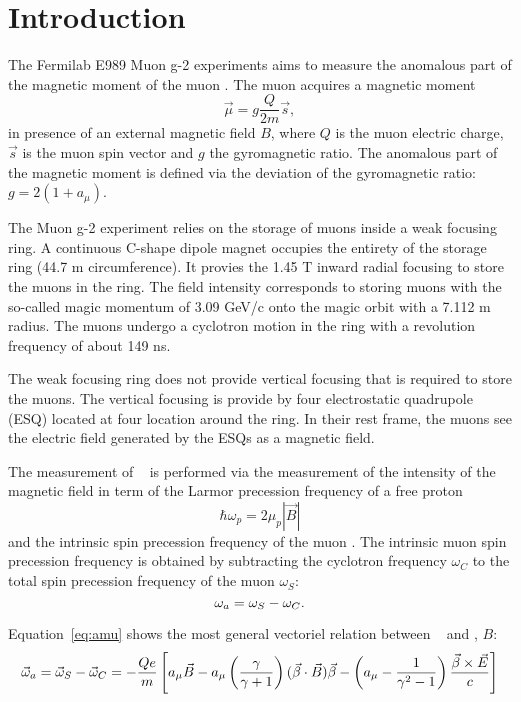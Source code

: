 \section{Introduction}

The Fermilab E989 Muon g-2 experiments aims to measure the anomalous part of the magnetic moment of the muon \amu.
The muon acquires a magnetic moment 
\begin{equation} 
\vec{\mu}=g \frac{Q}{2m} \vec{s},
\end{equation} in presence of an external magnetic field $B$, where $Q$ is the muon electric charge, $\vec{s}$ is the muon spin vector and $g$  the gyromagnetic ratio. 
The anomalous part of the magnetic moment is defined via the deviation of the gyromagnetic ratio: $g = 2(1+a_\mu)$.

The Muon g-2 experiment relies on the storage of muons inside a weak focusing ring. 
A continuous C-shape dipole magnet occupies the entirety of the storage ring (44.7 m circumference). 
It provies the 1.45 T inward radial focusing to store the muons in the ring. 
The field intensity corresponds to storing muons with the so-called magic momentum of 3.09 GeV/c onto the magic orbit with a 7.112 m radius.
The muons undergo a cyclotron motion in the ring with a revolution frequency of about 149 ns.

The weak focusing ring does not provide vertical focusing that is required to store the muons. 
The vertical focusing is provide by four electrostatic quadrupole (ESQ) located at four location around the ring.
In their rest frame, the muons see the electric field generated by the ESQs as a magnetic field.

The measurement of \amu~ is performed via the measurement of the intensity of the magnetic field in term of the Larmor precession frequency of a free proton 
\begin{equation}
\hbar \omega_{p} = 2 \mu_{p} | \overrightarrow{B}|
\end{equation}
and the intrinsic spin precession frequency of the muon \wa. 
The intrinsic muon spin precession frequency is obtained by subtracting the cyclotron frequency $\omega_C$ to the total spin precession frequency of the muon $\omega_S$:
\begin{equation}
\mbox{\ensuremath{\omega_a}} = \omega_S - \omega_C.
\end{equation}

Equation~\ref{eq:amu} shows the most general vectoriel relation between \amu~ and \wa, $B$:
\begin{equation}
\label{eq:amu}
\vec \omega_{a}=\vec \omega_S -\vec\omega_C 
=  - \frac{Qe}{ m}
\left[ a_{\mu} \vec B -  a_{\mu}\left( {\gamma \over \gamma + 1}\right)
(\vec \beta \cdot \vec B)\vec \beta 
- \left( a_{\mu}- {1 \over \gamma^2 - 1} \right) 
{ {\vec \beta \times \vec E }\over c }\right]
\end{equation}

